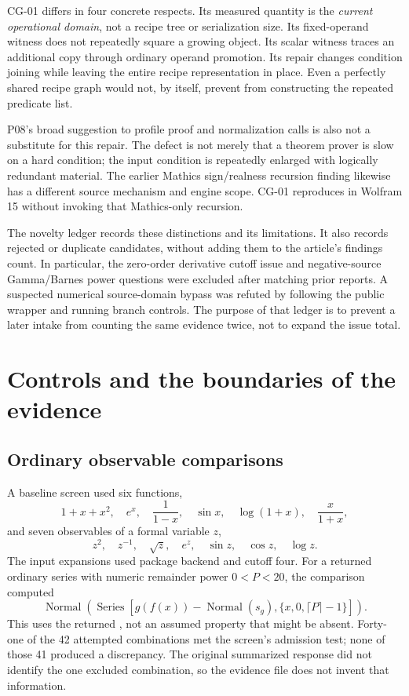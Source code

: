\documentclass[11pt,a4paper]{article}
\newcommand{\code}[1]{\texttt{\detokenize{#1}}}
\begin{document}
CG-01 differs in four concrete respects. Its measured quantity is the \emph{current operational domain}, not a recipe tree or serialization size. Its fixed-operand witness does not repeatedly square a growing object. Its scalar witness traces an additional copy through ordinary operand promotion. Its repair changes condition joining while leaving the entire recipe representation in place. Even a perfectly shared recipe graph would not, by itself, prevent \code{seriesBinary} from constructing the repeated predicate list.

P08's broad suggestion to profile proof and normalization calls is also not a substitute for this repair. The defect is not merely that a theorem prover is slow on a hard condition; the input condition is repeatedly enlarged with logically redundant material. The earlier Mathics sign/realness recursion finding likewise has a different source mechanism and engine scope. CG-01 reproduces in Wolfram 15 without invoking that Mathics-only recursion.\cite{status,wave6}

The novelty ledger records these distinctions and its limitations. It also records rejected or duplicate candidates, without adding them to the article's findings count. In particular, the zero-order derivative cutoff issue and negative-source Gamma/Barnes power questions were excluded after matching prior reports. A suspected numerical source-domain bypass was refuted by following the public wrapper and running branch controls. The purpose of that ledger is to prevent a later intake from counting the same evidence twice, not to expand the issue total.

\section{Controls and the boundaries of the evidence}
\label{sec:controls}

\subsection{Ordinary observable comparisons}
A baseline screen used six functions,
\[
 1+x+x^2,\quad e^x,\quad\frac1{1-x},\quad\sin x,
 \quad\log(1+x),\quad\frac{x}{1+x},
\]
and seven observables of a formal variable $z$,
\[
 z^2,\quad z^{-1},\quad\sqrt z,\quad e^z,
 \quad\sin z,\quad\cos z,\quad\log z.
\]
The input expansions used package backend and cutoff four. For a returned ordinary series with numeric remainder power $0<P<20$, the comparison computed
\[
 \operatorname{Normal}\!\left(\operatorname{Series}
  \left[g(f(x))-\operatorname{Normal}(s_g),\{x,0,\lceil P\rceil-1\}\right]\right).
\]
This uses the returned \code{RemainderPower}, not an assumed property that might be absent. Forty-one of the 42 attempted combinations met the screen's admission test; none of those 41 produced a discrepancy. The original summarized response did not identify the one excluded combination, so the evidence file does not invent that information.
\end{document}
